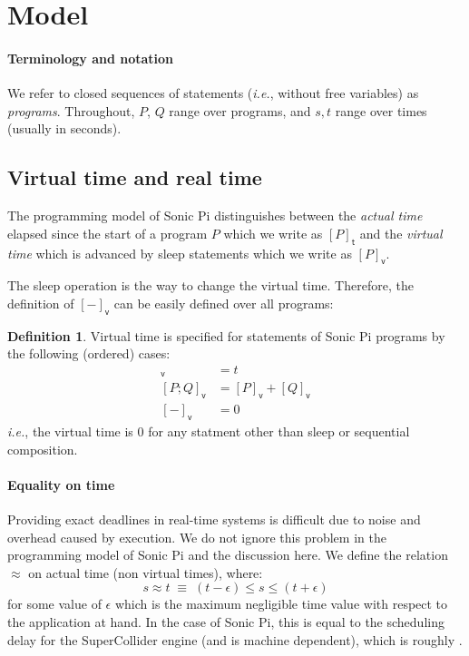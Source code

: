 \documentclass[preprint]{sigplanconf}
\renewcommand{\leq}{\leqslant}
\newcommand{\note}[1]{{\color{blue}{#1}}}
\theoremstyle{definition}
\newtheorem{definition}{Definition}
\newcommand{\sleep}{\mathsf{sleep}\;}
\newcommand{\sleepOp}{\textsf{sleep}}
\newcommand{\lang}{Sonic Pi}
\newcommand{\vtime}[1]{[#1]_{\mathsf{v}}}
\newcommand{\etime}[1]{[#1]_{\mathsf{t}}}
\newcommand{\ie}{\emph{i.e.}}
\begin{document}
\section{Model}

\paragraph{Terminology and notation}
We refer to closed sequences of statements (\ie{}, without free
variables) as \emph{programs}. Throughout, $P$, $Q$ range over programs,
and $s, t$ range over times (usually in seconds).

\subsection{Virtual time and real time}

The programming model of \lang{} distinguishes between the
\emph{actual time} elapsed since the start of a program $P$ which we
write as $\etime{P}$ and the \emph{virtual time} which is advanced by
\sleepOp{} statements which we write as $\vtime{P}$.

The \sleepOp{} operation is the way to change the virtual
time. Therefore, the definition of $\vtime{-}$ can be easily defined
over all programs:
%
\begin{definition}
Virtual time is specified for statements of \lang{} programs
by the following (ordered) cases:
%
\begin{align*}
\vtime{\sleep t} & = t \\
\vtime{P; Q} & = \vtime{P} + \vtime{Q} \\
\vtime{-} & = 0
\end{align*}
%
\ie{}, the virtual time is $0$
for any statment other than \sleepOp{} or sequential composition.
\label{sleep-spec}
\end{definition}
\note{I haven't included here expressions, for example, if a call
to a function that did some sleeping happened, then this is not accounted
for here. I could be easily incldued though.}

\paragraph{Equality on time}

Providing exact deadlines in real-time systems is difficult due
to noise and overhead caused by execution. We do not ignore
this problem in the programming model of \lang{} and the discussion here.
We define the relation $\approx$ on actual time (non virtual times), where:
\begin{equation}
s \approx t
\;
\equiv
\;
(t - \epsilon) \leq s \leq (t + \epsilon)
\end{equation}
%
for some value of $\epsilon$ which is the maximum negligible
time value with respect to the application at hand. In the case of
\lang{}, this is equal to the scheduling delay for the SuperCollider
engine (and is machine dependent), which is roughly \note{X}.
\end{document}
